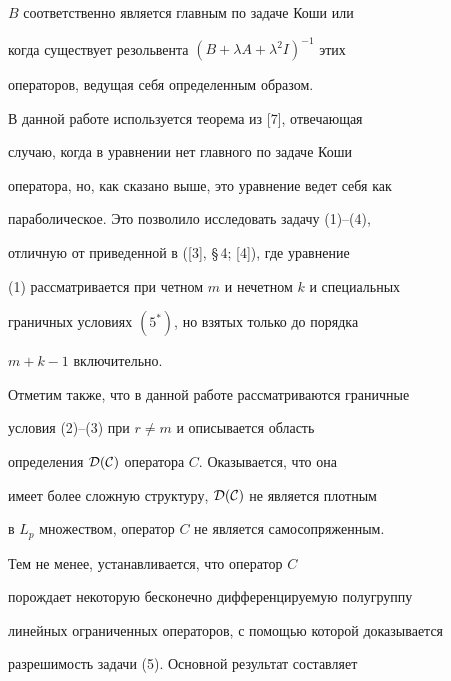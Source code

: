 $B$ соответственно является главным по задаче Коши или  


когда существует резольвента $(B+\lambda A+\lambda^2I)^{-1}$ этих 


операторов, ведущая себя определенным образом. 


 


В данной работе используется теорема из [7], отвечающая  


случаю, когда в уравнении нет главного по задаче Коши  


оператора, но, как сказано выше, это уравнение ведет себя как 


параболическое. Это позволило исследовать задачу (1)--(4),  


отличную от приведенной в ([3], \S\,4; [4]), где уравнение 


(1) рассматривается при четном $m$ и нечетном $k$ и специальных 


граничных условиях $(5^*)$, но взятых только до порядка 


$m+k-1$ включительно. 


 


Отметим также, что в данной работе рассматриваются граничные  


условия (2)--(3) при $r\ne m$ и описывается область  


определения $\cal D(C)$ оператора $C$. Оказывается, что она 


имеет более сложную структуру, $\cal D(C)$ не является плотным 


в $L_p$ множеством, оператор $C$ не является самосопряженным.  


Тем не менее, устанавливается, что оператор $C$ 


порождает некоторую бесконечно дифференцируемую полугруппу  


линейных ограниченных операторов, с помощью которой доказывается  


разрешимость задачи (5). Основной результат составляет  


 


